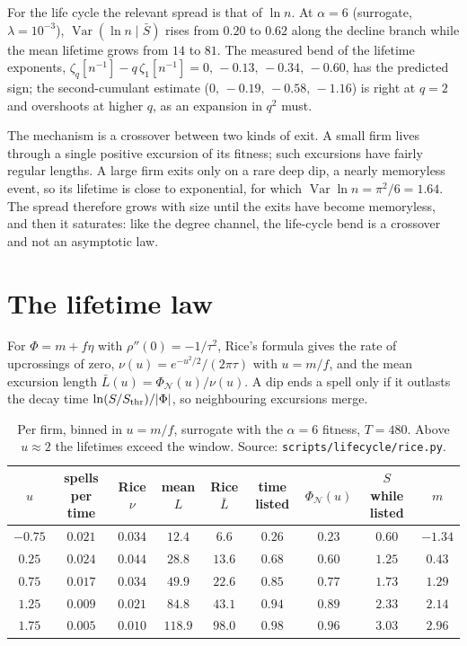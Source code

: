 \documentclass[11pt]{article}
\newcommand{\Var}{\operatorname{Var}}
\newcommand{\Sthr}{S_{\rm thr}}
\theoremstyle{remark}
\begin{document}
For the life cycle the relevant spread is that of $\ln n$.  At $\alpha=6$ (surrogate, $\lambda=10^{-3}$),
$\Var(\ln n\mid\bar S)$ rises from $0.20$ to $0.62$ along the decline branch while the mean lifetime grows from
$14$ to $81$.  The measured bend of the lifetime exponents, $\zeta_q[n^{-1}]-q\,\zeta_1[n^{-1}]=0,\,-0.13,\,-0.34,
\,-0.60$, has the predicted sign; the second-cumulant estimate ($0,\,-0.19,\,-0.58,\,-1.16$) is right at $q=2$ and
overshoots at higher $q$, as an expansion in $q^2$ must.

The mechanism is a crossover between two kinds of exit.  A small firm lives through a single positive excursion
of its fitness; such excursions have fairly regular lengths.  A large firm exits only on a rare deep dip, a
nearly memoryless event, so its lifetime is close to exponential, for which $\Var\ln n=\pi^2/6=1.64$.  The
spread therefore grows with size until the exits have become memoryless, and then it saturates: like the degree
channel, the life-cycle bend is a crossover and not an asymptotic law.

\section{The lifetime law}
\label{sec:rice}

For $\Phi=m+f\eta$ with $\rho''(0)=-1/\tau^2$, Rice's formula gives the rate of upcrossings of zero,
$\nu(u)=e^{-u^2/2}/(2\pi\tau)$ with $u=m/f$, and the mean excursion length $\bar L(u)=\Phi_{\mathcal
N}(u)/\nu(u)$.  A dip ends a spell only if it outlasts the decay time $\ln(S/\Sthr)/|\Phi|$, so neighbouring
excursions merge.

\begin{table}[h]
\centering\small\setlength{\tabcolsep}{4pt}
\begin{tabular}{c|cc|cc|cc|cc}
\toprule
$u$ & spells per time & Rice $\nu$ & mean $L$ & Rice $\bar L$ & time listed & $\Phi_{\mathcal N}(u)$ & $S$ while listed & $m$\\
\midrule
$-0.75$ & $0.021$ & $0.034$ & $12.4$ & $6.6$ & $0.26$ & $0.23$ & $0.60$ & $-1.34$\\
$0.25$  & $0.024$ & $0.044$ & $28.8$ & $13.6$ & $0.68$ & $0.60$ & $1.25$ & $0.43$\\
$0.75$  & $0.017$ & $0.034$ & $49.9$ & $22.6$ & $0.85$ & $0.77$ & $1.73$ & $1.29$\\
$1.25$  & $0.009$ & $0.021$ & $84.8$ & $43.1$ & $0.94$ & $0.89$ & $2.33$ & $2.14$\\
$1.75$  & $0.005$ & $0.010$ & $118.9$ & $98.0$ & $0.98$ & $0.96$ & $3.03$ & $2.96$\\
\bottomrule
\end{tabular}
\caption{Per firm, binned in $u=m/f$, surrogate with the $\alpha=6$ fitness, $T=480$.  Above $u\approx2$ the
lifetimes exceed the window.  Source: \texttt{scripts/lifecycle/rice.py}.}
\label{tab:rice}
\end{table}
\end{document}
